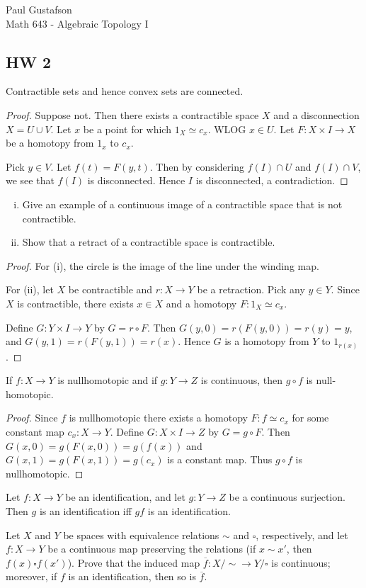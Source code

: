 \documentclass{article}
\begin{document}
\noindent Paul Gustafson\\
\noindent Math 643 - Algebraic Topology I

\subsection*{HW 2}
 Contractible sets and hence convex sets are connected. 
\begin{proof}
Suppose not.  Then there exists a contractible space $X$ and a disconnection $X = U \cup V$. Let $x$ be a point for which $1_X \simeq c_x$. WLOG $x \in U$. Let $F:X \times I \to X$ be a homotopy from $1_x$ to $c_x$. 

Pick $y \in V$. Let $f(t) = F(y,t)$. Then by considering $f(I) \cap U$ and $f(I) \cap V$, we see that $f(I)$ is disconnected.  Hence $I$ is disconnected, a contradiction.
\end{proof}

 \begin{enumerate}[(i)]
\item Give an example of a continuous image of a contractible space that is not contractible.
\item Show that a retract of a contractible space is contractible.
\end{enumerate}
\begin{proof}
For (i), the circle is the image of the line under the winding map.

For (ii), let $X$ be contractible and $r: X \to Y$ be a retraction. Pick any $y \in Y$. Since $X$ is contractible, there exists $x \in X$ and  a homotopy  $F:1_X \simeq c_x$. 

Define $G: Y \times I \to Y$ by $G = r \circ F$. Then $G(y, 0) = r(F(y, 0)) = r(y) = y$, and $G(y, 1) = r(F(y,1)) = r(x)$.  Hence $G$ is a homotopy from $Y$ to $1_{r(x)}$.
\end{proof}



 If $f: X \to Y$ is nullhomotopic and if $g: Y \to Z$ is continuous, then $g \circ f$ is 
null-homotopic.

\begin{proof}
Since $f$ is nullhomotopic there exists a homotopy $F:f \simeq c_x$ for some constant map $c_x:X \to Y$.  Define $G:X \times I \to Z$ by $G = g \circ F$. Then $G(x,0) = g(F(x,0)) = g(f(x))$ and $G(x,1) = g(F(x,1)) = g(c_x)$ is a constant map. Thus $g \circ f$ is nullhomotopic.
\end{proof}

 Let $f:X \to Y$ be an identification, and let $g: Y \to Z$ be a continuous surjection.
Then $g$ is an identification iff $gf$ is an identification.

 Let $X$ and $Y$ be spaces with equivalence relations $\sim$ and $\square$, respectively, and
let $f: X \to Y$ be a continuous map preserving the relations (if $x \sim x'$, then $f(x) \square f(x')$).
Prove that the induced map $\overline f: X/\sim \to Y / \square$ is continuous; moreover, if
$f$ is an identification, then so is $\overline f$.
\end{document}
